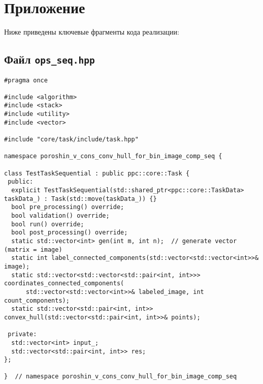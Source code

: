 \documentclass[12pt]{article}
\begin{document}
\section*{Приложение}
Ниже приведены ключевые фрагменты кода реализации:

\subsection*{Файл \texttt{ops\_seq.hpp}}
\begin{verbatim}
#pragma once

#include <algorithm>
#include <stack>
#include <utility>
#include <vector>

#include "core/task/include/task.hpp"

namespace poroshin_v_cons_conv_hull_for_bin_image_comp_seq {

class TestTaskSequential : public ppc::core::Task {
 public:
  explicit TestTaskSequential(std::shared_ptr<ppc::core::TaskData> taskData_) : Task(std::move(taskData_)) {}
  bool pre_processing() override;
  bool validation() override;
  bool run() override;
  bool post_processing() override;
  static std::vector<int> gen(int m, int n);  // generate vector (matrix = image)
  static int label_connected_components(std::vector<std::vector<int>>& image);
  static std::vector<std::vector<std::pair<int, int>>> coordinates_connected_components(
      std::vector<std::vector<int>>& labeled_image, int count_components);
  static std::vector<std::pair<int, int>> convex_hull(std::vector<std::pair<int, int>>& points);

 private:
  std::vector<int> input_;
  std::vector<std::pair<int, int>> res;
};

}  // namespace poroshin_v_cons_conv_hull_for_bin_image_comp_seq

\end{verbatim}
\newpage

\end{document}

